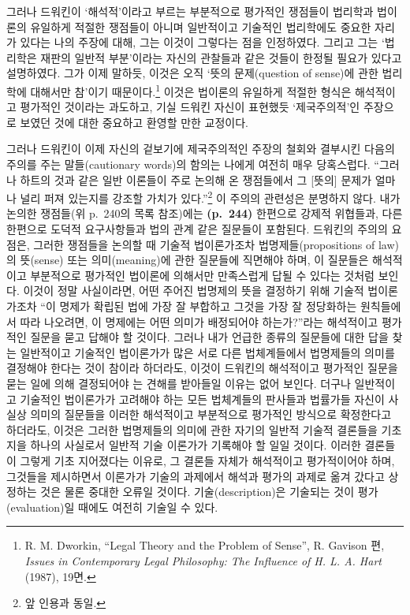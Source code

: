 그러나 드워킨이 ‘해석적’이라고 부르는 부분적으로 평가적인 쟁점들이
법리학과 법이론의 유일하게 적절한 쟁점들이 아니며 일반적이고 기술적인
법리학에도 중요한 자리가 있다는 나의 주장에 대해, 그는 이것이 그렇다는
점을 인정하였다. 그리고 그는 ‘법리학은 재판의 일반적 부분’이라는 자신의
관찰들과 같은 것들이 한정될 필요가 있다고 설명하였다. 그가 이제 말하듯,
이것은 오직 ‘뜻의 문제(question of sense)에 관한 법리학에 대해서만
참’이기 때문이다.\footnote{R. M. Dworkin, “Legal Theory and the Problem
  of Sense”, R. Gavison 편, \emph{Issues in Contemporary Legal
  Philosophy: The Influence of H. L. A. Hart} (1987), 19면.} 이것은
법이론의 유일하게 적절한 형식은 해석적이고 평가적인 것이라는 과도하고,
기실 드워킨 자신이 표현했듯 ‘제국주의적’인 주장으로 보였던 것에 대한
중요하고 환영할 만한 교정이다.

그러나 드워킨이 이제 자신의 겉보기에 제국주의적인 주장의 철회와 결부시킨
다음의 주의를 주는 말들(cautionary words)의 함의는 나에게 여전히 매우
당혹스럽다. “그러나 하트의 것과 같은 일반 이론들이 주로 논의해 온
쟁점들에서 그 {[}뜻의{]} 문제가 얼마나 널리 퍼져 있는지를 강조할 가치가
있다.”\footnote{앞 인용과 동일.} 이 주의의 관련성은 분명하지 않다. 내가
논의한 쟁점들(위 p.~240의 목록 참조)에는 \textbf{(p.~244)} 한편으로
강제적 위협들과, 다른 한편으로 도덕적 요구사항들과 법의 관계 같은
질문들이 포함된다. 드워킨의 주의의 요점은, 그러한 쟁점들을 논의할 때
기술적 법이론가조차 법명제들(propositions of law)의 뜻(sense) 또는
의미(meaning)에 관한 질문들에 직면해야 하며, 이 질문들은 해석적이고
부분적으로 평가적인 법이론에 의해서만 만족스럽게 답될 수 있다는 것처럼
보인다. 이것이 정말 사실이라면, 어떤 주어진 법명제의 뜻을 결정하기 위해
기술적 법이론가조차 “이 명제가 확립된 법에 가장 잘 부합하고 그것을 가장
잘 정당화하는 원칙들에서 따라 나오려면, 이 명제에는 어떤 의미가
배정되어야 하는가?”라는 해석적이고 평가적인 질문을 묻고 답해야 할
것이다. 그러나 내가 언급한 종류의 질문들에 대한 답을 찾는 일반적이고
기술적인 법이론가가 많은 서로 다른 법체계들에서 법명제들의 의미를
결정해야 한다는 것이 참이라 하더라도, 이것이 드워킨의 해석적이고
평가적인 질문을 묻는 일에 의해 결정되어야 는 견해를 받아들일
이유는 없어 보인다. 더구나 일반적이고 기술적인 법이론가가 고려해야 하는
모든 법체계들의 판사들과 법률가들 자신이 사실상 의미의 질문들을 이러한
해석적이고 부분적으로 평가적인 방식으로 확정한다고 하더라도, 이것은
그러한 법명제들의 의미에 관한 자기의 일반적 기술적 결론들을 기초 지을
하나의 사실로서 일반적 기술 이론가가 기록해야 할 일일 것이다. 이러한
결론들이 그렇게 기초 지어졌다는 이유로, 그 결론들 자체가 해석적이고
평가적이어야 하며, 그것들을 제시하면서 이론가가 기술의 과제에서 해석과
평가의 과제로 옮겨 갔다고 상정하는 것은 물론 중대한 오류일 것이다.
기술(description)은 기술되는 것이 평가(evaluation)일 때에도 여전히
기술일 수 있다.

